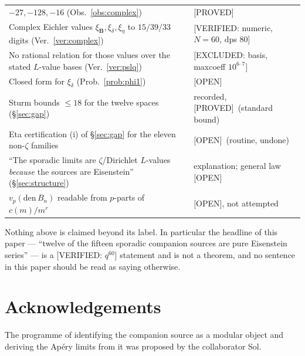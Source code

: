 \documentclass[11pt,reqno]{amsart}
\theoremstyle{plain}
\theoremstyle{definition}
\theoremstyle{remark}
\newcommand{\Proved}{\textup{\textsf{[PROVED]}}}
\newcommand{\VerifiedR}[1]{\textup{\textsf{[VERIFIED: #1]}}}
\newcommand{\ExcludedR}[1]{\textup{\textsf{[EXCLUDED: #1]}}}
\newcommand{\Open}{\textup{\textsf{[OPEN]}}}
\begin{document}
\begin{center}
\begin{tabular}{@{}>{\raggedright\arraybackslash}p{9.1cm} l@{}}
$-27,-128,-16$ (Obs.~\ref{obs:complex})
& \Proved\\
Complex Eichler values $\xi_{\mathbf B},\xi_\delta,\xi_\eta$ to
$15/39/33$ digits (Ver.~\ref{ver:complex})
& \VerifiedR{numeric, $N=60$, dps 80}\\
No rational relation for those values over the stated $L$-value bases
(Ver.~\ref{ver:pslq})
& \ExcludedR{basis, maxcoeff $10^{6\text{--}7}$}\\
Closed form for $\xi_\delta$ (Prob.~\ref{prob:phi1})
& \Open\\
Sturm bounds $\le18$ for the twelve spaces (\S\ref{sec:gap})
& recorded, \Proved\ (standard bound)\\
Eta certification (i) of \S\ref{sec:gap} for the eleven non-$\zeta$
families
& \Open\ (routine, undone)\\
``The sporadic limits are $\zeta$/Dirichlet $L$-values \emph{because} the
sources are Eisenstein'' (\S\ref{sec:structure})
& explanation; general law \Open\\
$v_p(\mathrm{den}\,B_n)$ readable from $p$-parts of $c(m)/m^r$
& \Open, not attempted\\
\bottomrule
\end{tabular}
\end{center}

Nothing above is claimed beyond its label. In particular the headline of
this paper --- ``twelve of the fifteen sporadic companion sources are pure
Eisenstein series'' --- is a \VerifiedR{$q^{60}$} statement and is not a
theorem, and no sentence in this paper should be read as saying otherwise.

\section*{Acknowledgements}
The programme of identifying the companion source as a modular object and
deriving the Ap\'ery limits from it was proposed by the collaborator Sol.
\end{document}

